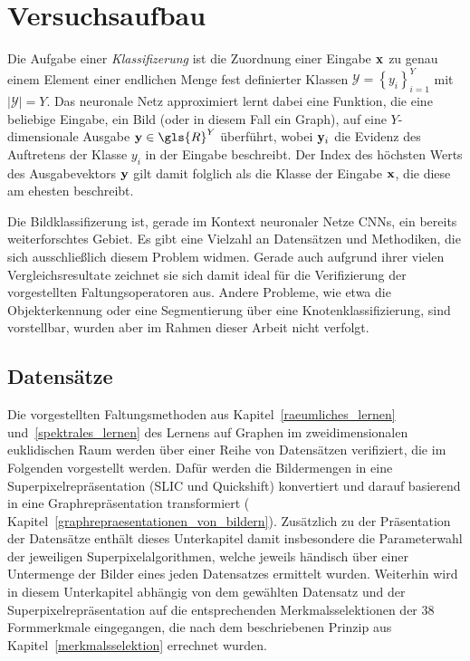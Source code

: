 \section{Versuchsaufbau}
\label{versuchsaufbau}

Die Aufgabe einer \emph{Klassifizerung} ist die Zuordnung einer Eingabe $\mathbf{x}$ zu genau einem Element einer endlichen Menge fest definierter Klassen $\mathcal{Y} = {\left\{y_i\right\}}_{i=1}^Y$ mit $\left|\mathcal{Y}\right| = Y$.
Das neuronale Netz approximiert \bzw{} lernt dabei eine Funktion, die eine beliebige Eingabe, \dhe{} ein Bild (oder in diesem Fall ein Graph), auf eine $Y$-dimensionale Ausgabe $\ve{y} \in \gls{R}^Y$ überführt, wobei $\mathbf{y}_i$ die Evidenz des Auftretens der Klasse $y_i$ in der Eingabe beschreibt.
Der Index des höchsten Werts des Ausgabevektors $\mathbf{y}$ gilt damit folglich als die Klasse der Eingabe $\mathbf{x}$, die diese am ehesten beschreibt.

Die Bildklassifizerung ist, gerade im Kontext neuronaler Netze \bzw{} \glspl{CNN}, ein bereits weiterforschtes Gebiet.
Es gibt eine Vielzahl an Datensätzen und Methodiken, die sich ausschließlich diesem Problem widmen.
Gerade auch aufgrund ihrer vielen Vergleichsresultate zeichnet sie sich damit ideal für die Verifizierung der vorgestellten Faltungsoperatoren aus.
Andere Probleme, wie etwa die Objekterkennung oder eine Segmentierung über eine Knotenklassifizierung, sind vorstellbar, wurden aber im Rahmen dieser Arbeit nicht verfolgt.

\subsection{Datensätze}
\label{datensaetze}

Die vorgestellten Faltungsmethoden aus Kapitel~\ref{raeumliches_lernen} und~\ref{spektrales_lernen} \bzgl{} des Lernens auf Graphen im zweidimensionalen euklidischen Raum werden über einer Reihe von Datensätzen verifiziert, die im Folgenden vorgestellt werden.
Dafür werden die Bildermengen in eine Superpixelrepräsentation (\gls{SLIC} und Quickshift) konvertiert und darauf basierend in eine Graphrepräsentation transformiert (\vgl{} Kapitel~\ref{graphrepraesentationen_von_bildern}).
Zusätzlich zu der Präsentation der Datensätze enthält dieses Unterkapitel damit insbesondere die Parameterwahl der jeweiligen Superpixelalgorithmen, welche jeweils händisch über einer Untermenge der Bilder eines jeden Datensatzes ermittelt wurden.
Weiterhin wird in diesem Unterkapitel abhängig von dem gewählten Datensatz und der Superpixelrepräsentation auf die entsprechenden Merkmalsselektionen der $38$ Formmerkmale eingegangen, die nach dem beschriebenen Prinzip aus Kapitel~\ref{merkmalsselektion} errechnet wurden.

